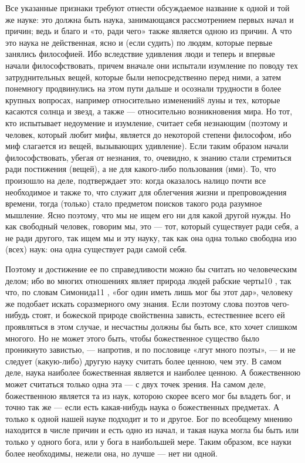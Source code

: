 \documentclass{article}
\begin{document}
Все указанные признаки требуют отнести обсуждаемое название к одной и той же науке: это должна быть наука, занимающаяся рассмотрением первых начал и причин; ведь и благо и «то, ради чего»
\footnotemark[3]
также является одною из причин. А что это наука не действенная,
\footnotemark[4]
ясно и (если судить) по людям, которые первые занялись философией. Ибо вследствие удивления люди и теперь и впервые начали философствовать, причем вначале они испытали изумление по поводу тех затруднительных вещей, которые были непосредственно перед ними, а затем понемногу продвинулись на этом пути дальше и осознали трудности в более крупных вопросах, например относительно изменений8  луны и тех, которые касаются солнца и звезд, а также --- относительно возникновения мира.
\footnotemark[6]
Но тот, кто испытывает недоумение и изумление, считает себя незнающим (поэтому и человек, который любит мифы, является до некоторой степени философом, ибо миф слагается из вещей, вызывающих удивление). Если таким образом начали философствовать, убегая от незнания, то, очевидно, к знанию стали стремиться ради постижения (вещей), а не для какого-либо пользования (ими). То, что произошло на деле, подтверждает это: когда оказалось налицо почти все необходимое и также то, что служит для облегчения жизни и препровождения времени, тогда (только) стало предметом поисков такого рода разумное мышление. Ясно поэтому, что мы не ищем его ни для какой другой нужды. Но как свободный человек, говорим мы, это --- тот, который существует ради себя, а не ради другого, так ищем мы и эту науку, так как она одна только свободна изо (всех) наук: она одна существует ради самой себя.

Поэтому и достижение ее по справедливости можно бы считать но человеческим делом; ибо во многих отношениях являет природа людей рабские черты10 , так что, по словам Симонида11 , «бог один иметь лишь мог бы этот дар», человеку же подобает искать соразмерного ому знания. Если поэтому слова поэтов чего-нибудь стоят, и божеской природе свойственна зависть, естественнее всего ей проявляться в этом случае, и несчастны должны бы быть все, кто хочет слишком многого. Но не может этого быть, чтобы божественное существо было проникнуто завистью, --- напротив, и по пословице «лгут много поэты», --- и не следует (какую-либо) другую науку считать более ценною, чем эту. В самом деле, наука наиболее божественная является и наиболее ценною. А божественною может считаться только одна эта --- с двух точек зрения. На самом деле, божественною является та из наук, которою скорее всего мог бы владеть бог, и точно так же --- если есть какая-нибудь наука о божественных предметах. А только к одной нашей науке подходит и то и другое. Бог по всеобщему мнению находится в числе причин и есть одно из начал, и такая наука могла бы быть или только у одного бога, или у бога в наибольшей мере. Таким образом, все науки более необходимы, нежели она, но лучше --- нет ни одной.
\end{document}
